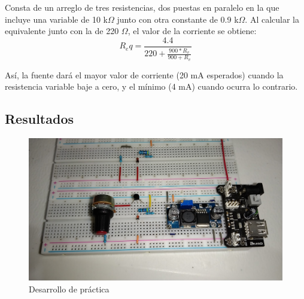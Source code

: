 Consta de un arreglo de tres resistencias, dos puestas en paralelo en la que incluye una variable de 10 k\(\Omega\) junto con
otra constante de 0.9 k\(\Omega\). Al calcular la equivalente junto con la de 220 \(\Omega\), el valor de la corriente se obtiene:
\[ R_eq = \frac{4.4}{220 + \frac{900*R_v}{900 + R_v}} \]

Así, la fuente dará el mayor valor de corriente (20 mA esperados) cuando la resistencia variable baje a cero, y el mínimo (4 mA)
cuando ocurra lo contrario.

\subsection{Resultados}

\begin{figure}[htb]
    \centering
    \includegraphics[scale=0.1]{media/IMG_20220303_191602.jpg}
    \caption{Desarrollo de práctica}
    \label{Fig: Desarrollo de práctica 1}
\end{figure}

